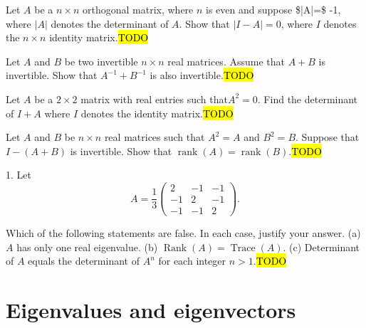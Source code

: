 \begin{example}
\label{exa:isi2005samplepsb3}Let $A$ be a $n\times n$ orthogonal
matrix, where $n$ is even and suppose \$|A|=\$ -1, where $|A|$ denotes
the determinant of $A$. Show that $|I-A|=0$, where $I$ denotes
the $n\times n$ identity matrix.\hl{TODO}
\end{example}

\begin{example}
\label{exa:isi2006samplepsb1}Let $A$ and $B$ be two invertible
$n\times n$ real matrices. Assume that $A+B$ is invertible. Show
that $A^{-1}+B^{-1}$ is also invertible.\hl{TODO}
\end{example}

\begin{example}
\label{exa:isi2007samplepsb1}Let $A$ be a $2\times2$ matrix with
real entries such that$A^{2}=0$. Find the determinant of $I+A$ where
$I$ denotes the identity matrix.\hl{TODO}
\end{example}

\begin{example}
\label{exa:isi2007samplepsb2}Let $A$ and $B$ be $n\times n$ real
matrices such that $A^{2}=A$ and $B^{2}=B$. Suppose that $I-(A+B)$
is invertible. Show that $\operatorname{rank}(A)=\operatorname{rank}(B)$.\hl{TODO}
\end{example}

\begin{example}
\label{exa:isi2008samplepsb1}1. Let 
\[
A=\frac{1}{3}\left(\begin{array}{rrr}
2 & -1 & -1\\
-1 & 2 & -1\\
-1 & -1 & 2
\end{array}\right).
\]

Which of the following statements are false. In each case, justify
your answer. (a) $A$ has only one real eigenvalue. (b) $\operatorname{Rank}(A)=\operatorname{Trace}(A)$.
(c) Determinant of $A$ equals the determinant of $A^{n}$ for each
integer $n>1$.\hl{TODO}
\end{example}


\section{Eigenvalues and eigenvectors\label{sec:finiteDimEigenvalues}}

